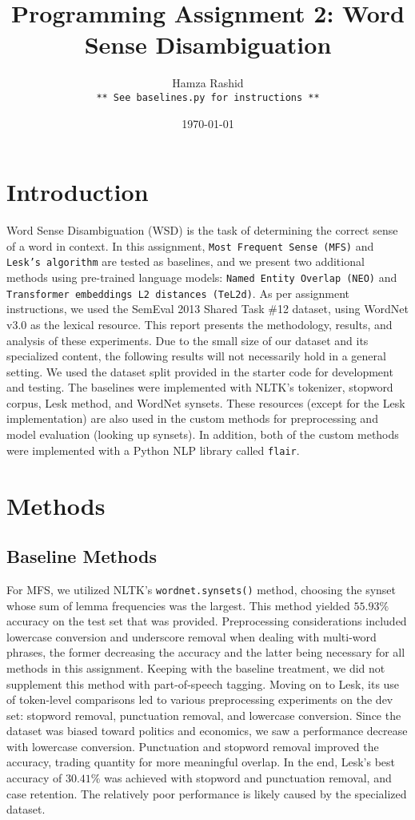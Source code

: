 \documentclass[11pt]{article}
\title{Programming Assignment 2: Word Sense Disambiguation}
\author{Hamza Rashid \\  \texttt{** See baselines.py for instructions **}}
\date{\today}
\begin{document}
\maketitle
\section{Introduction}
Word Sense Disambiguation (WSD) is the task of determining the correct sense of a word in context. 
In this assignment, \texttt{Most Frequent Sense (MFS)} and \texttt{Lesk’s algorithm} are tested as baselines, and we present
two additional methods using pre-trained language models: \texttt{Named Entity Overlap (NEO)} and \texttt{Transformer embeddings L2 distances (TeL2d)}.
As per assignment instructions, we used the SemEval 2013 Shared Task \#12 dataset, 
using WordNet v3.0 as the lexical resource. 
This report presents the methodology, results, and analysis of these experiments.
Due to the small size of our dataset 
and its specialized content, the following results will not necessarily hold in a general setting. We used the dataset split provided in the starter code for development and testing. The
baselines were implemented with NLTK's tokenizer, stopword corpus, Lesk method, and WordNet synsets. 
These resources (except for the Lesk implementation) are also used in the custom methods for preprocessing
and model evaluation (looking up synsets). In addition, both of the custom methods were implemented with 
a Python NLP library called \texttt{flair}.

\vspace{-2ex}
\section{Methods}
\subsection{Baseline Methods}
For MFS, we utilized NLTK's \texttt{wordnet.synsets()} method, choosing the synset whose sum of 
lemma frequencies was the largest. This method yielded $55.93\%$ accuracy on the test set that was provided. 
Preprocessing considerations included lowercase conversion and underscore removal when dealing with multi-word phrases,
the former decreasing the accuracy and the latter being necessary for all methods in this assignment. 
Keeping with the baseline treatment, we did not supplement this method with part-of-speech tagging.
Moving on to Lesk, its use of token-level comparisons led to various preprocessing experiments on the dev set: stopword removal, punctuation removal, and lowercase conversion. 
Since the dataset was biased toward politics and economics, we saw a performance decrease with lowercase conversion.
Punctuation and stopword removal improved the accuracy, trading quantity for more meaningful overlap.
In the end, Lesk's best accuracy of $30.41\%$ was achieved with stopword and punctuation removal,
and case retention. The relatively poor performance is likely caused by the specialized dataset. 
\end{document}
